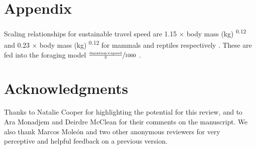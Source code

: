 \documentclass[a4paper,12pt]{article}
\begin{document}
\section*{Appendix}
Scaling relationships for sustainable travel speed are 1.15 $\times$ body mass (kg) \textsuperscript{0.12} and 0.23 $\times$ body mass (kg) \textsuperscript{0.12} for mammals and reptiles respectively \citep{ruxton2004obligate}.
These are fed into the foraging model $\sfrac{\frac{\text{duration} \times \text{speed}}{2}}{1000}$ \citep{Enstipp2006Energetics}.

\section*{Acknowledgments}
Thanks to Natalie Cooper for highlighting the potential for this review, and to Ara Monadjem and Deirdre McClean for their comments on the manuscript. We also thank Marcos Moleón and two other anonymous reviewers for very perceptive and helpful feedback on a previous version. 

\newpage


\end{document}

